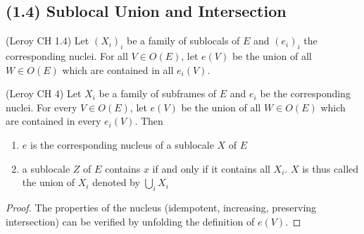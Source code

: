\subsection{(1.4) Sublocal Union and Intersection}

\begin{definition}
(Leroy CH 1.4)
    \label{def:sublocal_union}
    \leanok
    Let $(X_i)_i$ be a family of sublocals of $E$ and $(e_i)_i$ the corresponding nuclei.
    For all $V \in O(E)$, let $e(V)$ be the union of all $W \in O(E)$ which are contained in all $e_i(V)$.
\end{definition}

\begin{lemma}
(Leroy CH 4)
    \label{lem:sublocal_union}
    \leanok
    Let $X_i$ be a family of subframes of $E$ and $e_i$ be the corresponding nuclei. For every $V \in O(E)$, let
    $e(V)$ be the union of all $W \in O(E)$ which are contained in every $e_i(V)$. Then \\
    \begin{enumerate}
        \item $e$ is the corresponding nucleus of a sublocale $X$ of $E$
        \item a sublocale $Z$ of $E$ contains $x$ if and only if it contains all $X_i$. $X$ is thus called the union of
        $X_i$ denoted by $\bigcup_i X_i$
    \end{enumerate}
\end{lemma}
\begin{proof}
    The properties of the nucleus (idempotent, increasing, preserving intersection) can be verified by unfolding the
    definition of $e(V)$.
    \leanok
\end{proof}

